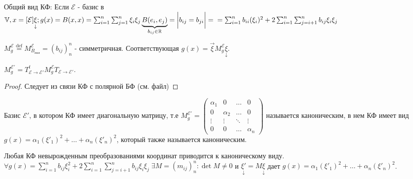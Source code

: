 \documentclass[../main.tex]{subfiles}
\begin{document}
Общий вид КФ: 
\noindent Если $\mathcal{E}$ - базис в $\mathbb{V},  x = [\mathcal{E}]\underset{\downarrow}{\xi}; g(x) = B(x,x) = \sum_{i=1}^{n} \sum_{j=1}^{n} \xi_{i}\xi_{j}\underbrace{B(e_{i},e_{j})}_{b_{ij}\in\mathbb{R}} =\bigg| b_{ij} = b_{ji} \bigg| = \\ = \sum_{i=1}^{n} b_{ii}(\xi_{i})^{2} + 2 \sum_{i    =1}^{n}\sum_{j=i+1}^{n} b_{ij} \xi_{i}\xi_{j}$
\begin{definition}
    $M_{g}^{\mathcal{E}}  \overset{\text{def}}{=} M_{B_{\text{пол}}}^{\mathcal{E}} = (b_{ij})^{n}_{n}$ - симметричная. Соответствующая $g(x) = \vec{\xi} M_{g}^{\mathcal{E}} \underset{\downarrow}{\xi}$.
\end{definition}
\begin{theorem}
    $M_{g}^{\mathcal{E'}} = T_{\mathcal{E}\to\mathcal{E'}}^{t} M_{g}^{\mathcal{E}} T_{\mathcal{E}\to\mathcal{E'}}$.
\end{theorem}
\begin{proof}
    Следует из связи КФ с полярной БФ (см. файл)
\end{proof}

\begin{definition}
    Базис $\mathcal{E'}$, в котором КФ имеет диагональную матрицу, т.е $M_{g}^{\mathcal{E'}} = \begin{pmatrix}
        \alpha_{1} & 0 & \dots & 0 \\
        0 & \alpha_{2} & \dots & 0 \\
        \vdots & \vdots & \ddots & \vdots \\
        0 & 0 & \dots & \alpha_{n}
        \end{pmatrix} $ называется каноническим, в нем КФ имеет вид $g(x) = \alpha_{1}( \xi'_{1})^{2} + \dots + \alpha_{n}(\xi'_{n})^{2}$, который также называется каноническим. 
\end{definition}
\newpage
\begin{theorem}[Лагранжа]
    Любая КФ невырожденным преобразованиями координат приводится к каноническому виду.  $\forall g(x) = \sum_{i =1}^{n  } b_{ij} \xi_{i}^{2} + 2 \sum_{i=1}^{n} \sum_{j=i+1}^{n} b_{ij} \xi_{i}\xi_{j} \; \exists M = (m_{ij})^{n}_{n} : \det{M}\neq  0 $ и $\underset{\downarrow}{\xi'} = M\underset{\downarrow}{\xi}$ дает $g(x) = \alpha_{1}(\xi'_{1})^{2} + \dots + \alpha_{n}(\xi'_{n})^{2}$.
\end{theorem}
\end{document}
